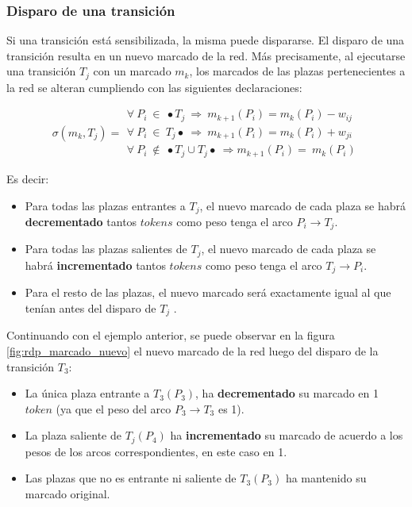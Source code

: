 \subsubsection{Disparo de una transición}
Si una transición está sensibilizada, la misma puede dispararse. El disparo de una transición resulta en un nuevo marcado de la red. Más precisamente, al ejecutarse una transición $T_j$ con un marcado $m_k$, los marcados de las plazas pertenecientes a la red se alteran cumpliendo con las siguientes declaraciones:

\begin{equation}
    \sigma (m_k, T_j) = 
    \begin{array}{cc}
         \forall \ P_i \ \in \ \bullet T_j \ \Rightarrow \ m_{k+1}(P_i) = m_k(P_i) - w_{ij}  \\
         \forall \ P_i \ \in \ T_j \bullet \ \Rightarrow \ m_{k+1}(P_i) = m_k(P_i) + w_{ji}  \\
         \forall \ P_i \ \notin \ \bullet T_j \cup T_j \bullet \ \Rightarrow m_{k+1}(P_i) = \ m_k(P_i)
    \end{array}
\end{equation}

\noindent Es decir:
\begin{itemize}
    \item Para todas las plazas entrantes a $T_j$, el nuevo marcado de cada plaza se habrá \textbf{decrementado} tantos $tokens$ como peso tenga el arco $P_i \rightarrow T_j$. 
    \item Para todas las plazas salientes de $T_j$, el nuevo marcado de cada plaza se habrá \textbf{incrementado} tantos $tokens$ como peso tenga el arco $T_j \rightarrow P_i$.
    \item Para el resto de las plazas, el nuevo marcado será exactamente igual al que tenían antes del disparo de $T_j$ .
\end{itemize}

Continuando con el ejemplo anterior, se puede observar en la figura \ref{fig:rdp_marcado_nuevo} el nuevo marcado de la red luego del disparo de la transición $T_3$:

\begin{itemize}
    \item La única plaza entrante a $T_3(P_3 )$, ha \textbf{decrementado} su marcado en 1 $token$ (ya que el peso del arco $P_3 \rightarrow T_3$ es 1).
    \item La plaza saliente de $T_j(P_4)$ ha \textbf{incrementado} su marcado de acuerdo a los pesos de los arcos correspondientes, en este caso en 1.
    \item Las plazas que no es entrante ni saliente de $T_3(P_3)$ ha mantenido su marcado original.
\end{itemize}

